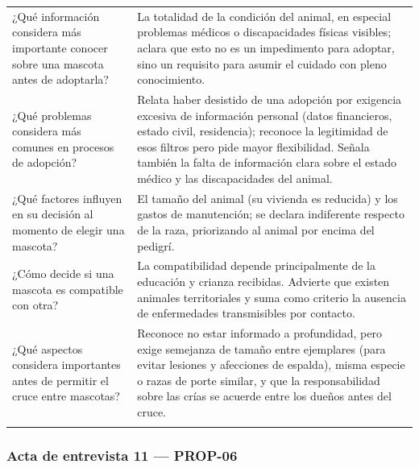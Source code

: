 \documentclass[journal,onecolumn]{IEEEtran}
\begin{document}
{\begin{longtable}{@{}p{5.6cm} p{9.4cm}@{}}
			¿Qué información considera más importante conocer sobre una mascota antes de adoptarla? & La totalidad de la condición del animal, en especial problemas médicos o discapacidades físicas visibles; aclara que esto no es un impedimento para adoptar, sino un requisito para asumir el cuidado con pleno conocimiento. \\ \addlinespace
			
			¿Qué problemas considera más comunes en procesos de adopción? & Relata haber desistido de una adopción por exigencia excesiva de información personal (datos financieros, estado civil, residencia); reconoce la legitimidad de esos filtros pero pide mayor flexibilidad. Señala también la falta de información clara sobre el estado médico y las discapacidades del animal. \\ \addlinespace
			
			¿Qué factores influyen en su decisión al momento de elegir una mascota? & El tamaño del animal (su vivienda es reducida) y los gastos de manutención; se declara indiferente respecto de la raza, priorizando al animal por encima del pedigrí. \\ \addlinespace
			
			¿Cómo decide si una mascota es compatible con otra? & La compatibilidad depende principalmente de la educación y crianza recibidas. Advierte que existen animales territoriales y suma como criterio la ausencia de enfermedades transmisibles por contacto. \\ \addlinespace
			
			¿Qué aspectos considera importantes antes de permitir el cruce entre mascotas? & Reconoce no estar informado a profundidad, pero exige semejanza de tamaño entre ejemplares (para evitar lesiones y afecciones de espalda), misma especie o razas de porte similar, y que la responsabilidad sobre las crías se acuerde entre los dueños antes del cruce. \\ \addlinespace
			
		\end{longtable}
	}
	
	
	\subsubsection*{Acta de entrevista 11 --- PROP-06}
	
\end{document}
